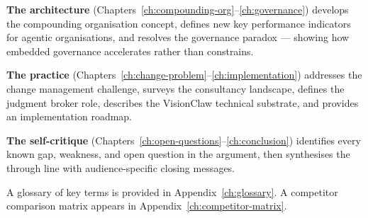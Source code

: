 \textbf{The architecture} (Chapters~\ref{ch:compounding-org}--\ref{ch:governance}) develops the compounding organisation concept, defines new key performance indicators for agentic organisations, and resolves the governance paradox --- showing how embedded governance accelerates rather than constrains.

\textbf{The practice} (Chapters~\ref{ch:change-problem}--\ref{ch:implementation}) addresses the change management challenge, surveys the consultancy landscape, defines the judgment broker role, describes the VisionClaw technical substrate, and provides an implementation roadmap.

\textbf{The self-critique} (Chapters~\ref{ch:open-questions}--\ref{ch:conclusion}) identifies every known gap, weakness, and open question in the argument, then synthesises the through line with audience-specific closing messages.

A glossary of key terms is provided in Appendix~\ref{ch:glossary}. A competitor comparison matrix appears in Appendix~\ref{ch:competitor-matrix}.
